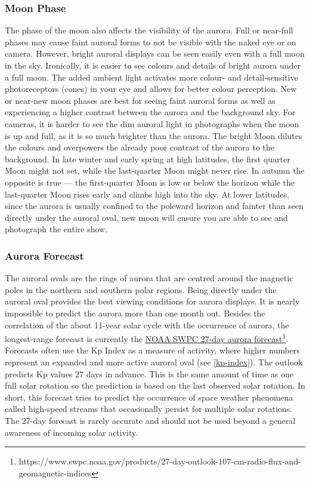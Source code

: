 \documentclass{article}
\begin{document}
\subsubsection{Moon Phase}
The phase of the moon also affects the visibility of the aurora. Full or near-full phases may cause faint auroral forms to not be visible with the naked eye or on camera. However, bright auroral displays can be seen easily even with a full moon in the sky. Ironically, it is easier to see colours and details of bright aurora under a full moon. The added ambient light activates more colour- and detail-sensitive photoreceptors (cones) in your eye and allows for better colour perception. New or near-new moon phases are best for seeing faint auroral forms as well as experiencing a higher contrast between the aurora and the background sky. For cameras, it is harder to see the dim auroral light in photographs when the moon is up and full, as it is so much brighter than the aurora. The bright Moon dilutes the colours and overpowers the already poor contrast of the aurora to the background. In late winter and early spring at high latitudes, the first quarter Moon might not set, while the last-quarter Moon might never rise. In autumn the opposite is true — the first-quarter Moon is low or below the horizon while the last-quarter Moon rises early and climbs high into the sky. At lower latitudes, since the aurora is usually confined to the poleward horizon and fainter than seen directly under the auroral oval, new moon will ensure you are able to see and photograph the entire show.

\subsubsection{Aurora Forecast}
The auroral ovals are the rings of aurora that are centred around the magnetic poles in the northern and southern polar regions. Being directly under the auroral oval provides the best viewing conditions for aurora displays. It is nearly impossible to predict the aurora more than one month out. Besides the correlation of the about 11-year solar cycle with the occurrence of aurora, the longest-range forecast is currently the \href{https://www.swpc.noaa.gov/products/27-day-outlook-107-cm-radio-flux-and-geomagnetic-indices}{NOAA SWPC 27-day aurora forecast}\footnote{https://www.swpc.noaa.gov/products/27-day-outlook-107-cm-radio-flux-and-geomagnetic-indices}. Forecasts often use the Kp Index as a measure of activity, where higher numbers represent an expanded and more active auroral oval (see \ref{kp-index}). The outlook predicts Kp values 27 days in advance. This is the same amount of time as one full solar rotation so the prediction is based on the last observed solar rotation. In short, this forecast tries to predict the occurrence of space weather phenomena called high-speed streams that occasionally persist for multiple solar rotations. The 27-day forecast is rarely accurate and should not be used beyond a general awareness of incoming solar activity.
\end{document}
